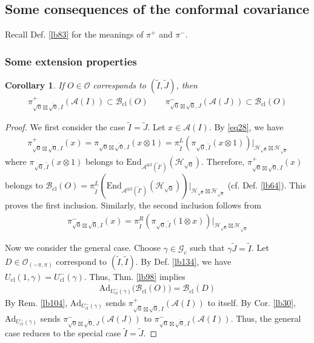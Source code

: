 \documentclass[11pt,b5paper,notitlepage]{article}
\theoremstyle{definition}
\theoremstyle{plain}
\newtheorem{co}[df]{Corollary}
\newcommand{\wtd}{\widetilde}
\newcommand{\ovl}{\overline}
\newcommand{\End}{\mathrm{End}} %
\newcommand{\Ad}{\mathrm{Ad}}
\newcommand{\Gc}{\mathscr G_c}
\newcommand{\MA}{\mathcal A}
\newcommand{\MH}{\mathcal H}
\newcommand{\MO}{\mathcal O}
\newcommand{\Maa}{{\mathcal A^{\otimes 2}}}
\newcommand{\sqz}{{\sqrt 0}}
\newcommand{\Bcl}{\mathcal B_{\mathrm{cl}}}
\newcommand{\Opp}{\mathcal O_{(-\pi,\pi)}}
\newcommand{\Ucl}{U_{\mathrm{cl}}}
\numberwithin{equation}{section}
\begin{document}
\subsection{Some consequences of the conformal covariance}

Recall Def. \ref{lb83} for the meanings of $\pi^+$ and $\pi^-$.

\subsubsection{Some extension properties}



\begin{co}\label{lb135}
If $O\in\MO$ corresponds to $(\wtd I,\wtd J)$, then
\begin{align*}
\pi^+_{\sqz\boxtimes\ovl\sqz,I}(\MA(I))\subset \Bcl(O)\qquad \pi^-_{\sqz\boxtimes\ovl\sqz,J}(\MA(J))\subset \Bcl(O)
\end{align*}
\end{co}

\begin{proof}
We first consider the case $\wtd I=\wtd J$. Let $x\in\MA(I)$. By \eqref{eq28}, we have
\begin{align*}
\pi^+_{\sqz\boxtimes\ovl\sqz,I}(x)=\pi_{\sqz\boxtimes\ovl\sqz,I}(x\otimes 1)=\pi^L_{\wtd I}(\pi_{\sqz,\wtd I}(x\otimes 1))|_{\MH_\sqz\boxtimes\MH_{\ovl\sqz}}
\end{align*}
where $\pi_{\sqz,\wtd I}(x\otimes 1)$ belongs to $\End_{\Maa(\wtd I')}(\MH_\sqz)$. Therefore, $\pi^+_{\sqz\boxtimes\ovl\sqz,I}(x)$ belongs to $\Bcl(O)=\pi^L_{\wtd I}(\End_{\Maa(\wtd I')}(\MH_\sqz))|_{\MH_\sqz\boxtimes\MH_{\ovl\sqz}}$ (cf. Def. \ref{lb64}). This proves the first inclusion. Similarly, the second inclusion follows from
\begin{align*}
\pi^-_{\sqz\boxtimes\ovl\sqz,I}(x)=\pi^R_{\wtd I}(\pi_{\sqz,\wtd I}(1\otimes x))|_{\MH_\sqz\boxtimes\MH_{\ovl\sqz}}
\end{align*}


Now we consider the general case. Choose $\gamma\in\Gc$ such that $\gamma\wtd J=\wtd I$. Let $D\in\Opp$ correspond to $(\wtd I,\wtd I)$. By Def. \ref{lb134}, we have $\Ucl(1,\gamma)=\Ucl^-(\gamma)$. Thus, Thm. \ref{lb98} implies
\begin{align*}
\Ad_{\Ucl^-(\gamma)}\big(\Bcl(O)\big)=\Bcl(D)
\end{align*}
By Rem. \ref{lb104}, $\Ad_{\Ucl^-(\gamma)}$ sends $\pi^+_{\sqz\boxtimes\ovl\sqz,I}(\MA(I))$ to itself. By Cor. \ref{lb30}, $\Ad_{\Ucl^-(\gamma)}$ sends $\pi^-_{\sqz\boxtimes\ovl\sqz,J}(\MA(J))$ to $\pi^-_{\sqz\boxtimes\ovl\sqz,I}(\MA(I))$. Thus, the general case reduces to the special case $\wtd I=\wtd J$.
\end{proof}
\end{document}
